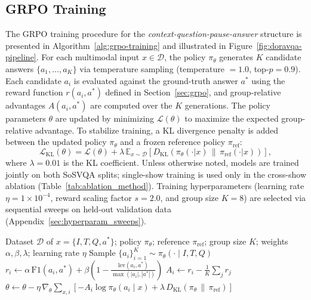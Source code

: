 \documentclass{article}
\begin{document}
\subsection{GRPO Training}
\label{sec:training}

The GRPO training procedure for the \textit{context-question-pause-answer}  structure is presented in Algorithm~\ref{alg:grpo-training} and illustrated in Figure~\ref{fig:doravqa-pipeline}. For each multimodal input $x \in \mathcal{D}$, the policy $\pi_\theta$ generates 
$K$ candidate answers $\{a_1, \ldots, a_K\}$ via temperature sampling 
(temperature $= 1.0$, top-$p = 0.9$). Each candidate $a_i$ is evaluated 
against the ground-truth answer $a^*$ using the reward function 
$r(a_i, a^*)$ defined in Section~\ref{sec:grpo}, and group-relative 
advantages $A(a_i, a^*)$ are computed over the $K$ generations. The policy parameters $\theta$ are updated by minimizing $\mathcal{L}(\theta)$ to 
maximize the expected group-relative advantage. To stabilize training, a 
KL divergence penalty is added between the updated policy $\pi_\theta$ and 
a frozen reference policy $\pi_{\text{ref}}$:
\begin{equation}
    \mathcal{L}_{\text{KL}}(\theta) = \mathcal{L}(\theta) + 
    \lambda\, \mathbb{E}_{x \sim \mathcal{D}}\left[
    D_{\text{KL}}\!\left(\pi_\theta(\cdot|x) \,\|\, 
    \pi_{\text{ref}}(\cdot|x)\right)\right],
\end{equation}
where $\lambda = 0.01$ is the KL coefficient. Unless otherwise noted, models are trained jointly on both SoSVQA splits; single-show training is used only in the cross-show ablation (Table~\ref{tab:ablation_method}). Training hyperparameters (learning rate $\eta = 1 \times 10^{-4}$, reward scaling factor $s = 2.0$, and group size $K = 8$) are selected via sequential sweeps on held-out validation data (Appendix~\ref{sec:hyperparam_sweeps}).

\begin{algorithm}[t]
\caption{GRPO Training with Context-Question-Pause-Answer Structure}
\label{alg:grpo-training}
\begin{algorithmic}[1]
\Require Dataset $\mathcal{D}$ of $x{=}\{I, T, Q, a^*\}$; policy $\pi_\theta$;
         reference $\pi_{\text{ref}}$; group size $K$; weights $\alpha,\beta,\lambda$;
         learning rate $\eta$
        \State Sample $\{a_i\}_{i=1}^{K} \sim \pi_\theta(\cdot \mid I, T, Q)$
        \State $r_i \gets \alpha\,\text{F1}(a_i, a^*) + \beta\!\left(1 - \tfrac{\text{lev}(a_i, a^*)}{\max(|a_i|,|a^*|)}\right)$
        \State $A_i \gets r_i - \tfrac{1}{K}\textstyle\sum_{j} r_j$
    \EndFor
    \State $\theta \gets \theta - \eta\,\nabla_\theta \sum_{x,i}\!\left[-A_i \log\pi_\theta(a_i \mid x) + \lambda\, D_{\text{KL}}(\pi_\theta \,\|\, \pi_{\text{ref}})\right]$
\EndFor
\end{algorithmic}
\end{algorithm}
\end{document}
